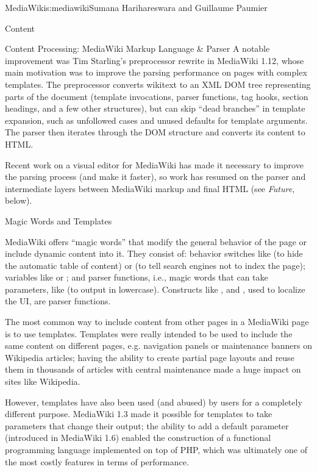 \begin{aosachapter}{MediaWiki}{s:mediawiki}{Sumana Harihareswara and Guillaume Paumier}
\begin{aosasect1}{Content}
\begin{aosasect2}{Content Processing: MediaWiki Markup Language \& Parser}
A notable improvement was Tim Starling's preprocessor rewrite in
MediaWiki 1.12, whose main motivation was to improve the parsing
performance on pages with complex templates. The preprocessor converts
wikitext to an XML DOM tree representing parts of the document
(template invocations, parser functions, tag hooks, section headings,
and a few other structures), but can skip ``dead branches'' in template
expansion, such as unfollowed  cases and unused defaults
for template arguments. The parser then iterates through the DOM
structure and converts its content to HTML.

Recent work on a visual editor for MediaWiki has made it necessary to
improve the parsing process (and make it faster), so work has resumed
on the parser and intermediate layers between MediaWiki markup and
final HTML (see \emph{Future}, below).

\end{aosasect2}

\begin{aosasect2}{Magic Words and Templates}

MediaWiki offers ``magic words'' that modify the general behavior of the
page or include dynamic content into it. They consist of: behavior
switches like  (to hide the automatic table of
content) or  (to tell search engines not to index
the page); variables like  or
; and parser functions, i.e., magic words that can
take parameters, like 
(to output  in
lowercase). Constructs like ,  and
, used to localize the UI, are parser functions.

The most common way to include content from other pages in a MediaWiki
page is to use templates. Templates were really intended to be used to
include the same content on different pages, e.g. navigation panels or
maintenance banners on Wikipedia articles; having the ability to
create partial page layouts and reuse them in thousands of articles
with central maintenance made a huge impact on sites like Wikipedia.

However, templates have also been used (and abused) by users for a
completely different purpose. MediaWiki 1.3 made it possible for
templates to take parameters that change their output; the ability to
add a default parameter (introduced in MediaWiki 1.6) enabled the
construction of a functional programming language implemented on top
of PHP, which was ultimately one of the most costly features in terms
of performance.


\end{aosasect2}
\end{aosasect1}
\end{aosachapter}
